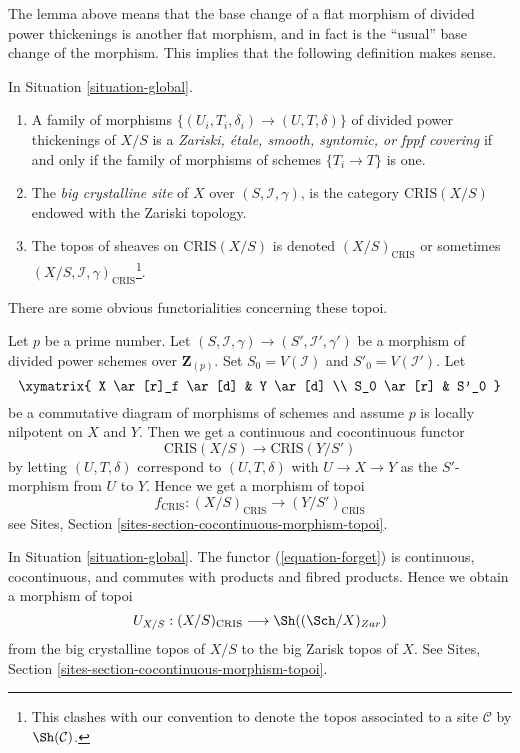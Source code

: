 \noindent
The lemma above means that the base change of a flat morphism
of divided power thickenings is another flat morphism, and in
fact is the ``usual'' base change of the morphism. This implies
that the following definition makes sense.

\begin{definition}
\label{definition-big-crystalline-site}
In Situation \ref{situation-global}.
\begin{enumerate}
\item A family of morphisms $\{(U_i, T_i, \delta_i) \to (U, T, \delta)\}$
of divided power thickenings of $X/S$ is a {\it Zariski, \'etale, smooth,
syntomic, or fppf covering} if and only if the family of morphisms
of schemes $\{T_i \to T \}$ is one.
\item The {\it big crystalline site} of $X$ over $(S, \mathcal{I}, \gamma)$,
is the category $\text{CRIS}(X/S)$ endowed with the Zariski topology.
\item The topos of sheaves on $\text{CRIS}(X/S)$ is denoted
$(X/S)_{\text{CRIS}}$ or sometimes
$(X/S, \mathcal{I}, \gamma)_{\text{CRIS}}$\footnote{This clashes with
our convention to denote the topos associated to a site $\mathcal{C}$
by $\Sh(\mathcal{C})$.}.
\end{enumerate}
\end{definition}

\noindent
There are some obvious functorialities concerning these topoi.

\begin{remark}[Functoriality]
\label{remark-functoriality-big-cris}
Let $p$ be a prime number.
Let $(S, \mathcal{I}, \gamma) \to (S', \mathcal{I}', \gamma')$ be a
morphism of divided power schemes over $\mathbf{Z}_{(p)}$.
Set $S_0 = V(\mathcal{I})$ and $S'_0 = V(\mathcal{I}')$.
Let
$$
\xymatrix{
X \ar[r]_f \ar[d] & Y \ar[d] \\
S_0 \ar[r] & S'_0
}
$$
be a commutative diagram of morphisms of schemes and assume $p$ is
locally nilpotent on $X$ and $Y$. Then we get a continuous and
cocontinuous functor
$$
\text{CRIS}(X/S) \longrightarrow \text{CRIS}(Y/S')
$$
by letting $(U, T, \delta)$ correspond to $(U, T, \delta)$
with $U \to X \to Y$ as the $S'$-morphism from $U$ to $Y$.
Hence we get a morphism of topoi
$$
f_{\text{CRIS}} : (X/S)_{\text{CRIS}} \longrightarrow (Y/S')_{\text{CRIS}}
$$
see Sites, Section \ref{sites-section-cocontinuous-morphism-topoi}.
\end{remark}

\begin{remark}
\label{remark-compare-big-zariski}
In Situation \ref{situation-global}.
The functor (\ref{equation-forget}) is continuous, cocontinuous, and
commutes with products and fibred products.
Hence we obtain a morphism of topoi
$$
U_{X/S} : (X/S)_{\text{CRIS}} \longrightarrow \Sh((\Sch/X)_{Zar})
$$
from the big crystalline topos of $X/S$ to the big Zarisk topos of $X$.
See Sites, Section \ref{sites-section-cocontinuous-morphism-topoi}.
\end{remark}

